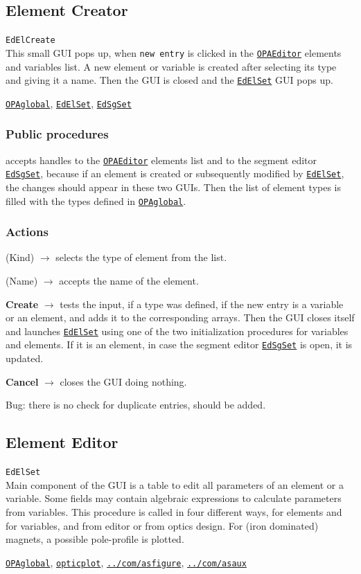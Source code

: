 \documentclass[12pt]{article}
\newcommand\code[1]{{\tt #1}}
\newcommand{\ofld}[1]{\colorbox{black!15}{{\bf #1}}}
\newcommand{\ofldx}[1]{\colorbox{black!15}{(#1)}}
\newcommand\guico[1]{{\color{blue}\code{#1}}}
\newcommand{\evcod}[2]{\ofld{#1} $\rightarrow$ \guico{#2}}
\newcommand{\evcodx}[2]{\ofldx{#1} $\rightarrow$ \guico{#2}}
\newcommand{\opagui}[1]{\colorbox{blue!20}{\code{#1}}}
\newcommand{\oguih}[2]{\subsection{\label{#2}#1}{\Huge\opagui{#2}}\\}
\newcommand{\ogui}[1]{\hyperref[#1]{\opagui{#1}}}
\newcommand{\opaguif}[1]{\colorbox{violet!30}{\code{#1}}}
\newcommand{\oguif}[1]{\hyperref[#1]{\opaguif{#1}}}
\newcommand{\opauni}[1]{\colorbox{orange!30}{\code{#1}}}
\newcommand{\ouni}[1]{\hyperref[#1]{\opauni{#1}}}
\newcommand{\uses}[1]{\flushleft {\bf Uses:} #1}
\newcommand{\desc}[1]{#1}
\newcommand{\act}[1]{\subsubsection*{Actions} #1}
\newcommand{\ppro}[1]{\subsubsection*{Public procedures} #1}
\newcommand{\todo}[1]{{\color{red} #1}}
\begin{document}
\oguih{Element Creator}{EdElCreate} 

\desc{This small GUI pops up, when \code{new entry} is clicked in the \ouni{OPAEditor} elements and variables list. A new element or variable is created after selecting its type and giving it a name. Then the GUI is closed and the \ogui{EdElSet} GUI pops up.}

\uses{\ouni{OPAglobal}, \ogui{EdElSet}, \ogui{EdSgSet} }   
\ppro{
\guico{Init} accepts handles to the \ogui{OPAEditor} elements list and to the segment editor \ouni{EdSgSet}, because if an element is created or subsequently modified by \ogui{EdElSet}, the changes should appear in these two GUIs. Then the list of element types is filled with the types defined in \ouni{OPAglobal}.
}

\act{
\evcodx{Kind}{ComETypeChange} selects the type of element from the list.

\evcodx{Name}{EdENameChange} accepts the name of the element.

\evcod{Create}{ButCreClick} tests the input, if a type was defined, if the new entry is a variable or an element, and adds it to the corresponding arrays. Then the GUI closes itself and launches \ogui{EdElSet} using one of the two initialization procedures for variables and elements. If it is an element, in case  the segment editor \ogui{EdSgSet} is open, it is updated.

\evcod{Cancel}{ButCanClick} closes the GUI doing nothing.
}

\todo{Bug: there is no check for duplicate entries, should be added.}


\oguih{Element Editor}{EdElSet} 

\desc{
Main component of the GUI is a table to edit all parameters of an element or a variable. Some fields may contain algebraic expressions to calculate parameters from variables. This procedure is called in four different ways, for elements and for variables, and from editor or from optics design. For (iron dominated) magnets, a possible pole-profile is plotted.
}

\uses{\ouni{OPAglobal}, \ouni{opticplot}, \oguif{../com/asfigure}, \ouni{../com/asaux}}
\end{document}
